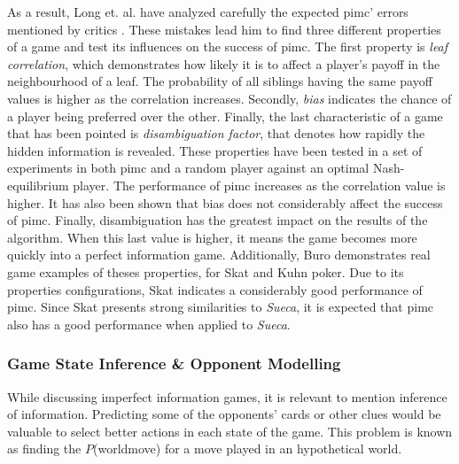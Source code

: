 As a result, Long et. al. have analyzed carefully the expected \gls{pimc}' errors mentioned by critics \cite{Long2010}.
These mistakes lead him to find three different properties of a game and test its influences on the success of \gls{pimc}.
The first property is \emph{leaf correlation}, which demonstrates how likely it is to affect a player's payoff in the neighbourhood of a leaf.
The probability of all siblings having the same payoff values is higher as the correlation increases.
Secondly, \emph{bias} indicates the chance of a player being preferred over the other.
Finally, the last characteristic of a game that has been pointed is \emph{disambiguation factor}, that denotes how rapidly the hidden information is revealed.
These properties have been tested in a set of experiments in both \gls{pimc} and a random player against an optimal Nash-equilibrium player.
The performance of \gls{pimc} increases as the correlation value is higher.
It has also been shown that bias does not considerably affect the success of \gls{pimc}.
Finally, disambiguation has the greatest impact on the results of the algorithm.
When this last value is higher, it means the game becomes more quickly into a perfect information game.
Additionally, Buro demonstrates real game examples of theses properties, for Skat and Kuhn poker.
Due to its properties configurations, Skat indicates a considerably good performance of \gls{pimc}.
Since Skat presents strong similarities to \emph{Sueca}, it is expected that \gls{pimc} also has a good performance when applied to \emph{Sueca}.




\subsubsection{Game State Inference \& Opponent Modelling}


While discussing imperfect information games, it is relevant to mention inference of information.
Predicting some of the opponents' cards or other clues would be valuable to select better actions in each state of the game.
This problem is known as finding the $P$(world\textbar move) for a move played in an hypothetical world.


